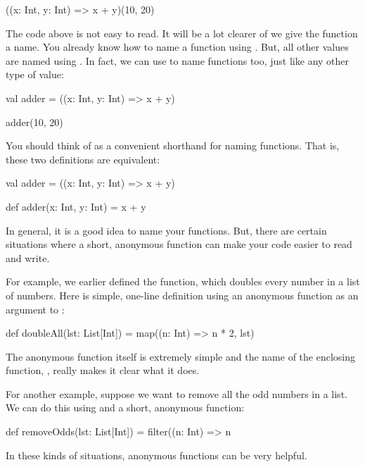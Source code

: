 \documentclass{book}
\begin{document}
\begin{scalacode}
((x: Int, y: Int) => x + y)(10, 20)
\end{scalacode}

The code above is not easy to read. It will be a lot clearer of we give the
function a name. You already know how to name a function using . But, all
other values are named using . In fact, we can use  to name functions
too, just like any other type of value:

\begin{scalacode}
val adder = ((x: Int, y: Int) => x + y)

adder(10, 20)
\end{scalacode}

You should think of  as a convenient shorthand for naming functions.
That is, these two definitions are equivalent:

\begin{scalacode}
val adder = ((x: Int, y: Int) => x + y)

def adder(x: Int, y: Int) = x + y
\end{scalacode}

In general, it is a good idea to name your functions. But, there are
certain situations where a short, anonymous function can make your code
easier to read and write.

For example, we earlier defined the  function, which doubles
every number in a list of numbers. Here is simple, one-line definition
using an anonymous function as an argument to :

\begin{scalacode}
def doubleAll(lst: List[Int]) = map((n: Int) => n * 2, lst)
\end{scalacode}

The anonymous function itself is extremely simple and the name of the enclosing
function, , really makes it clear what it does.

For another example, suppose we want to remove all the odd numbers
in a list. We can do this using  and a short, anonymous function:

\begin{scalacode}
def removeOdds(lst: List[Int]) = filter((n: Int) => n %
\end{scalacode}

In these kinds of situations, anonymous functions can be very helpful.
\end{document}
